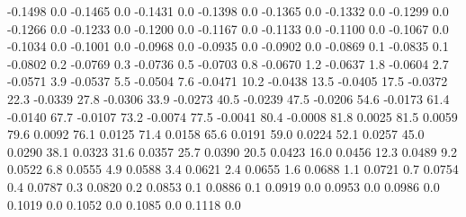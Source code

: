 -0.1498 0.0
-0.1465 0.0
-0.1431 0.0
-0.1398 0.0
-0.1365 0.0
-0.1332 0.0
-0.1299 0.0
-0.1266 0.0
-0.1233 0.0
-0.1200 0.0
-0.1167 0.0
-0.1133 0.0
-0.1100 0.0
-0.1067 0.0
-0.1034 0.0
-0.1001 0.0
-0.0968 0.0
-0.0935 0.0
-0.0902 0.0
-0.0869 0.1
-0.0835 0.1
-0.0802 0.2
-0.0769 0.3
-0.0736 0.5
-0.0703 0.8
-0.0670 1.2
-0.0637 1.8
-0.0604 2.7
-0.0571 3.9
-0.0537 5.5
-0.0504 7.6
-0.0471 10.2
-0.0438 13.5
-0.0405 17.5
-0.0372 22.3
-0.0339 27.8
-0.0306 33.9
-0.0273 40.5
-0.0239 47.5
-0.0206 54.6
-0.0173 61.4
-0.0140 67.7
-0.0107 73.2
-0.0074 77.5
-0.0041 80.4
-0.0008 81.8
0.0025 81.5
0.0059 79.6
0.0092 76.1
0.0125 71.4
0.0158 65.6
0.0191 59.0
0.0224 52.1
0.0257 45.0
0.0290 38.1
0.0323 31.6
0.0357 25.7
0.0390 20.5
0.0423 16.0
0.0456 12.3
0.0489 9.2
0.0522 6.8
0.0555 4.9
0.0588 3.4
0.0621 2.4
0.0655 1.6
0.0688 1.1
0.0721 0.7
0.0754 0.4
0.0787 0.3
0.0820 0.2
0.0853 0.1
0.0886 0.1
0.0919 0.0
0.0953 0.0
0.0986 0.0
0.1019 0.0
0.1052 0.0
0.1085 0.0
0.1118 0.0
